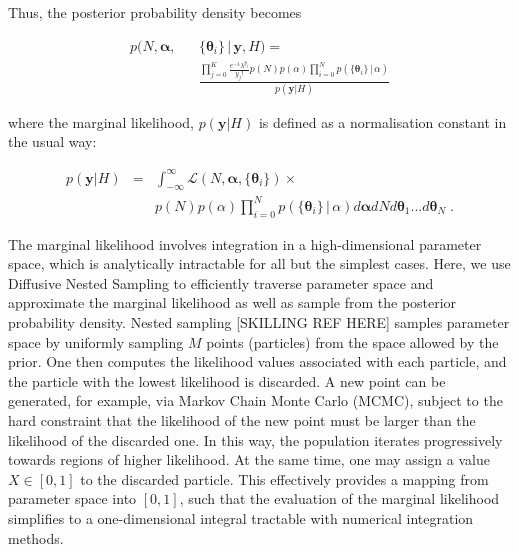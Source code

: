 \documentclass[12pt]{emulateapj}
\newcommand{\given}{\,|\,}
\newcommand{\counts}{y}
\newcommand{\likelihood}{{\mathcal L}}
\begin{document}
Thus, the posterior probability density becomes

\begin{eqnarray}
p(N, \bm{\alpha}, &&\{\bm{\theta}_i \}  \given \bm{\counts}, H) = \\ 
&& \frac{\prod\limits_{j=0}^{K}{ \frac{e^{-\lambda} \lambda^{y_j} }{y_j! }} p(N)p(\alpha) \prod\limits_{i=0}^{N}  p(\{\bm{\theta}_i\}\given \alpha)}{p(\bm{\counts} | H)}  \nonumber
\end{eqnarray}

where the marginal likelihood, $p(\bm{\counts} | H)$ is defined as a normalisation constant in the usual way: 

\begin{eqnarray}
p(\bm{\counts} | H) & = & \int_{-\infty}^{\infty}{\likelihood(N, \bm{\alpha}, \{\bm{\theta}_i \})} \times \\ \nonumber
&& p(N)p(\alpha) \prod\limits_{i=0}^{N}  p(\{\bm{\theta}_i\}\given \alpha) d\bm{\alpha} dN d\bm{\theta}_1 ... d\bm{\theta}_N \; .
\end{eqnarray}

The marginal likelihood involves integration in a high-dimensional parameter space, which is analytically intractable for all but the
simplest cases. Here, we use Diffusive Nested Sampling to efficiently traverse parameter space and approximate the marginal 
likelihood as well as sample from the posterior probability density. 
Nested sampling [SKILLING REF HERE] samples parameter space by uniformly sampling $M$ points (particles) from the space allowed by the prior. 
One then computes the likelihood values associated with each particle, and the particle with the lowest likelihood is discarded. A new point
can be generated, for example, via Markov Chain Monte Carlo (MCMC), subject to the hard constraint that the
likelihood of the new point must be larger than the likelihood of the discarded one. In this way, the population iterates progressively towards
regions of higher likelihood. At the same time, one may assign a value $X  \in [0, 1]$ to the discarded particle. This effectively provides a 
mapping from parameter space into $[0,1]$, such that the evaluation of the marginal likelihood simplifies to a one-dimensional 
integral tractable with numerical integration methods.
\end{document}
